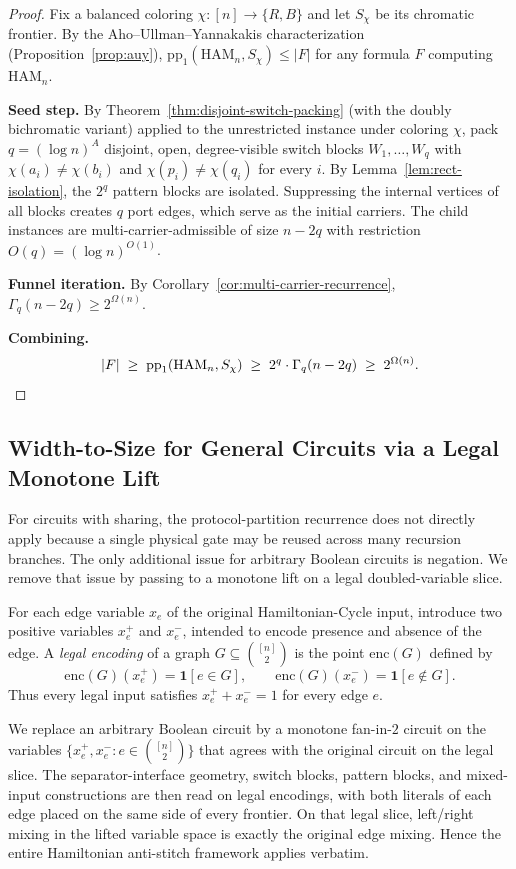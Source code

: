 \documentclass[11pt]{article}
\newcommand{\Ham}{\mathrm{HAM}}
\begin{document}
\begin{proof}
Fix a balanced coloring $\chi : [n] \to \{R, B\}$ and let $S_\chi$ be
its chromatic frontier.  By the Aho--Ullman--Yannakakis characterization
(Proposition~\ref{prop:auy}), $\mathrm{pp}_1(\Ham_n, S_\chi) \le |F|$
for any formula $F$ computing $\Ham_n$.

\textbf{Seed step.}
By Theorem~\ref{thm:disjoint-switch-packing} (with the doubly bichromatic
variant) applied to the unrestricted instance under coloring $\chi$, pack
$q = (\log n)^A$ disjoint, open, degree-visible switch blocks
$W_1, \ldots, W_q$ with $\chi(a_i) \neq \chi(b_i)$ and
$\chi(p_i) \neq \chi(q_i)$ for every $i$.
By Lemma~\ref{lem:rect-isolation}, the $2^q$ pattern blocks are isolated.
Suppressing the internal vertices of all blocks creates $q$ port edges,
which serve as the initial carriers.  The child instances are
multi-carrier-admissible of size $n - 2q$ with restriction $O(q) =
(\log n)^{O(1)}$.

\textbf{Funnel iteration.}
By Corollary~\ref{cor:multi-carrier-recurrence},
$\Gamma_q(n - 2q) \ge 2^{\Omega(n)}$.

\textbf{Combining.}
\[
|F| \;\ge\; \mathrm{pp}_1(\Ham_n, S_\chi)
\;\ge\; 2^q \cdot \Gamma_q(n - 2q)
\;\ge\; 2^{\Omega(n)}.  \qedhere
\]
\end{proof}

\subsection{Width-to-Size for General Circuits via a Legal Monotone Lift}
\label{subsec:width-to-size}

For circuits with sharing, the protocol-partition recurrence does not
directly apply because a single physical gate may be reused across many
recursion branches.  The only additional issue for arbitrary Boolean
circuits is negation.  We remove that issue by passing to a monotone lift
on a legal doubled-variable slice.

For each edge variable $x_e$ of the original Hamiltonian-Cycle input,
introduce two positive variables $x_e^+$ and $x_e^-$, intended to encode
presence and absence of the edge.  A \emph{legal encoding} of a graph
$G\subseteq\binom{[n]}{2}$ is the point $\mathrm{enc}(G)$ defined by
\[
\mathrm{enc}(G)(x_e^+)=\mathbf{1}[e\in G],
\qquad
\mathrm{enc}(G)(x_e^-)=\mathbf{1}[e\notin G].
\]
Thus every legal input satisfies $x_e^++x_e^-=1$ for every edge $e$.

We replace an arbitrary Boolean circuit by a monotone fan-in-$2$ circuit
on the variables $\{x_e^+,x_e^-:e\in\binom{[n]}{2}\}$ that agrees with
the original circuit on the legal slice.  The separator-interface
geometry, switch blocks, pattern blocks, and mixed-input constructions
are then read on legal encodings, with both literals of each edge placed
on the same side of every frontier.  On that legal slice, left/right
mixing in the lifted variable space is exactly the original edge mixing.
Hence the entire Hamiltonian anti-stitch framework applies verbatim.
\end{document}
